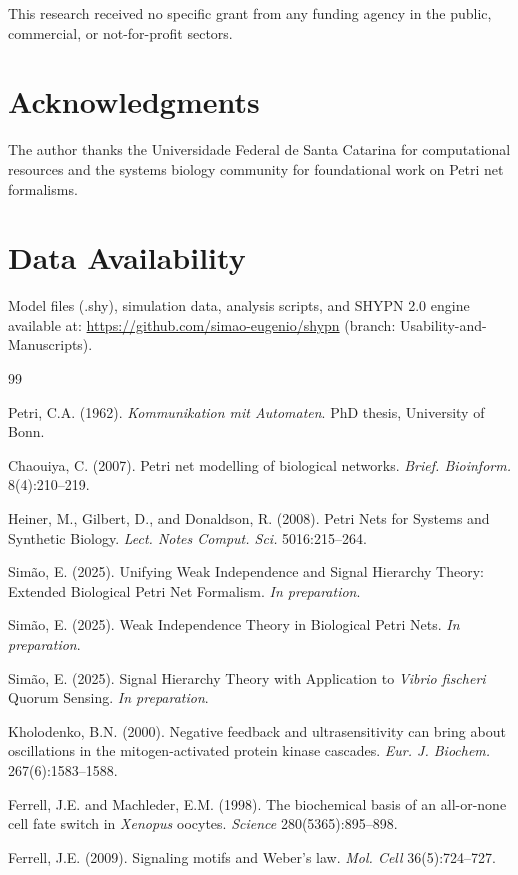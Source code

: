 \documentclass[twocolumn,11pt]{article}
\begin{document}
This research received no specific grant from any funding agency in the public, commercial, or not-for-profit sectors.

\section*{Acknowledgments}

The author thanks the Universidade Federal de Santa Catarina for computational resources and the systems biology community for foundational work on Petri net formalisms.

\section*{Data Availability}

Model files (.shy), simulation data, analysis scripts, and SHYPN 2.0 engine available at: \url{https://github.com/simao-eugenio/shypn} (branch: Usability-and-Manuscripts).


\begin{thebibliography}{99}
\setlength{\itemsep}{3pt}

Petri, C.A. (1962).
\newblock \textit{Kommunikation mit Automaten}.
\newblock PhD thesis, University of Bonn.

Chaouiya, C. (2007).
\newblock Petri net modelling of biological networks.
\newblock \textit{Brief. Bioinform.} 8(4):210--219.

Heiner, M., Gilbert, D., and Donaldson, R. (2008).
\newblock Petri Nets for Systems and Synthetic Biology.
\newblock \textit{Lect. Notes Comput. Sci.} 5016:215--264.

Simão, E. (2025).
\newblock Unifying Weak Independence and Signal Hierarchy Theory: Extended Biological Petri Net Formalism.
\newblock \textit{In preparation}.

Simão, E. (2025).
\newblock Weak Independence Theory in Biological Petri Nets.
\newblock \textit{In preparation}.

Simão, E. (2025).
\newblock Signal Hierarchy Theory with Application to \textit{Vibrio fischeri} Quorum Sensing.
\newblock \textit{In preparation}.

Kholodenko, B.N. (2000).
\newblock Negative feedback and ultrasensitivity can bring about oscillations in the mitogen-activated protein kinase cascades.
\newblock \textit{Eur. J. Biochem.} 267(6):1583--1588.

Ferrell, J.E. and Machleder, E.M. (1998).
\newblock The biochemical basis of an all-or-none cell fate switch in \textit{Xenopus} oocytes.
\newblock \textit{Science} 280(5365):895--898.

Ferrell, J.E. (2009).
\newblock Signaling motifs and Weber's law.
\newblock \textit{Mol. Cell} 36(5):724--727.

\end{thebibliography}
\end{document}
